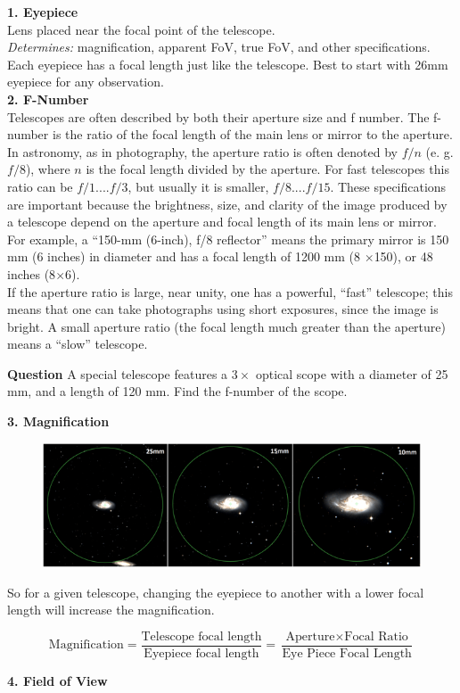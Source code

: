 \documentclass[a4paper,12pt]{extarticle}
\begin{document}
\textbf{1. Eyepiece}\\ 

Lens placed near the focal point of the telescope.\\
\textit{Determines:} magnification, apparent FoV, true FoV, and other specifications. Each eyepiece has a focal length just like the telescope. Best to start with 26mm eyepiece for any observation.\\


\textbf{2. F-Number}\\ 

Telescopes are often described by both their aperture size and f number. The f-number is the ratio of the focal length of the main lens or mirror to the aperture. In astronomy, as in photography, the aperture ratio is often denoted by $f/n$ (e. g. $f/8$), where $n$ is the focal length divided by the aperture. For fast telescopes this ratio can be $f/1. . . . f/3$, but usually it is smaller, $f/8. . . . f/15$. These specifications are important because the brightness, size, and clarity of the image produced by a telescope depend on the aperture and focal length of its main lens or mirror. For example, a “150-mm (6-inch), f/8 reflector” means the primary mirror is 150 mm (6 inches) in diameter and has a focal length of 1200 mm (8 $\times$150), or 48 inches (8$\times$6).\\

If the aperture ratio is large, near unity, one has a powerful, ``fast'' telescope; this means that one can take photographs using short exposures, since the image is bright. A small aperture ratio (the focal length much greater than the aperture) means a ``slow'' telescope.

\begin{pro}
	\textsf{\textbf{Question}} A special telescope features a $3\times$ optical scope  with a diameter of 25 mm, and a length of 120 mm. Find the f-number of the scope.
\end{pro}
\vspace{1cm}
\textbf{3. Magnification}
\begin{figure}[H]
	\centering
	\includegraphics[width=0.8\linewidth]{tel_magnify.png}
\end{figure}
So for a given telescope, changing the eyepiece to another with a lower focal length will increase the magnification.
\begin{defi}
	\[\text{Magnification}=\frac{\text{Telescope focal length}}{\text{Eyepiece focal length}}=\frac{\text{Aperture}\times \text{Focal Ratio}}{\text{Eye Piece Focal Length}}\]
\end{defi} 
\textbf{4. Field of View}\\
\end{document}
